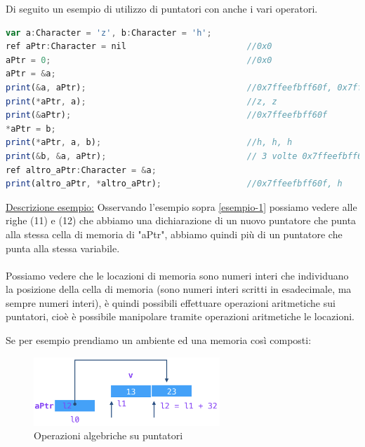 \begin{example}\label{esempio-1}
Di seguito un esempio di utilizzo di puntatori con anche i vari operatori.
\end{example}
\vspace{2pt}
\begin{lstlisting}[language=Javascript, caption=Esempio puntatori e operatori sui puntatori]
var a:Character = 'z', b:Character = 'h';
ref aPtr:Character = nil                        //0x0
aPtr = 0;                                       //0x0
aPtr = &a;                                      
print(&a, aPtr);                                //0x7ffeefbff60f, 0x7ffeefbff60f
print(*aPtr, a);                                //z, z
print(&aPtr);                                   //0x7ffeefbff60f
*aPtr = b;
print(*aPtr, a, b);                             //h, h, h
print(&b, &a, aPtr);                            // 3 volte 0x7ffeefbff60f
ref altro_aPtr:Character = &a;                  
print(altro_aPtr, *altro_aPtr);                 //0x7ffeefbff60f, h
\end{lstlisting}
\vspace{3pt}

\hspace{-15pt}\underline{Descrizione esempio:} Osservando l'esempio sopra \ref{esempio-1} possiamo vedere alle righe (11) e (12) che abbiamo una dichiarazione di un nuovo puntatore che punta alla stessa cella di memoria di "aPtr", abbiamo quindi più di un puntatore che punta alla stessa variabile.\\\\
Possiamo vedere che le locazioni di memoria sono numeri interi che individuano la posizione della cella di memoria (sono numeri interi scritti in esadecimale, ma sempre numeri interi), è quindi possibili effettuare operazioni aritmetiche sui puntatori, cioè è possibile manipolare tramite operazioni aritmetiche le locazioni.\\
\begin{example}
Se per esempio prendiamo un ambiente ed una memoria così composti:
\end{example}
\begin{figure}
    \vspace{-5pt}
    \centering
    \includegraphics[width=7cm]{images/esempio-puntatori-1.png}
    \caption{Operazioni algebriche su puntatori}
\end{figure}

